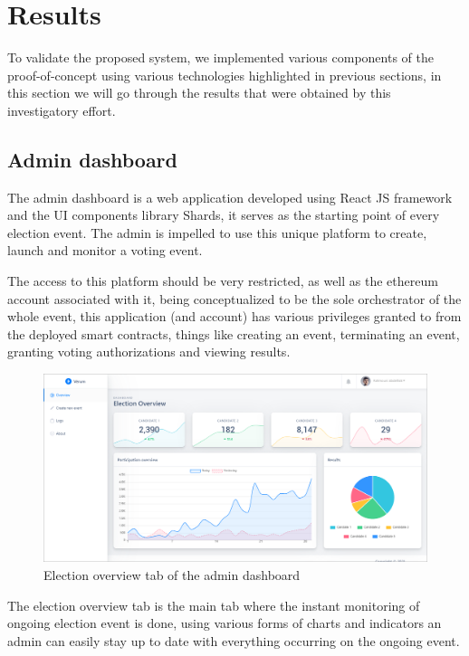 \section{Results}

To validate the proposed system, we implemented various components of the proof-of-concept using various technologies highlighted in previous sections, in this section we will go through the results that were obtained by this investigatory effort.

\subsection{Admin dashboard}

The admin dashboard is a web application developed using React JS framework and the UI components library Shards\cite{designvisionShardsReactOnline}, it serves as the starting point of every election event. The admin is impelled to use this unique platform to create, launch and monitor a voting event.

The access to this platform should be very restricted, as well as the ethereum account associated with it, being conceptualized to be the sole orchestrator of the whole event, this application (and account) has various privileges granted to from the deployed smart contracts, things like creating an event, terminating an event, granting voting authorizations and viewing results.

\begin{figure}[H]
	\centering
		\includegraphics[width=14cm]{images/chapter3/admin_1.png}
		\caption{{\footnotesize Election overview tab of the admin dashboard}}
\end{figure}

The election overview tab is the main tab where the instant monitoring of ongoing election event is done, using various forms of charts and indicators an admin can easily stay up to date with everything occurring on the ongoing event.

